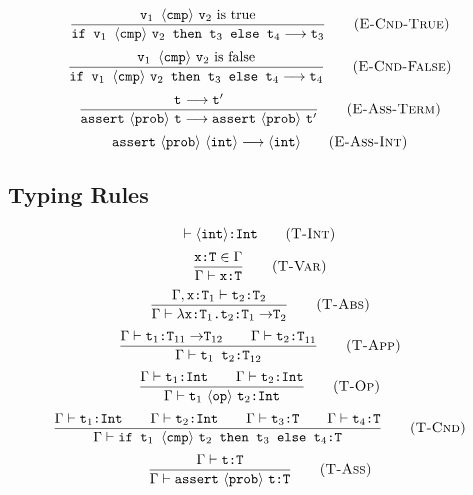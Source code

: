 \documentclass[a4paper]{article}
\begin{document}
\begin{equation}
	\frac{\text{\tt v$_1$ }\langle\text{\tt cmp}\rangle\text{ \tt v$_2$}\text{ is true}}
	{\text{\tt if v$_1$ }\langle\text{\tt cmp}\rangle\text{ \tt v$_2$ then t$_3$ else t$_4$}\longrightarrow
	\text{\tt t}_3}
	\tag{\sc E-Cnd-True}
\end{equation}
\begin{equation}
	\frac{\text{\tt v$_1$ }\langle\text{\tt cmp}\rangle\text{ \tt v$_2$}\text{ is false}}
	{\text{\tt if v$_1$ }\langle\text{\tt cmp}\rangle\text{ \tt v$_2$ then t$_3$ else t$_4$}\longrightarrow
	\text{\tt t}_4}
	\tag{\sc E-Cnd-False}
\end{equation}
\begin{equation}
	\frac{\text{\tt t}_{}\longrightarrow\text{\tt t}^{\prime}_{}}
	{\text{\tt assert}\ \langle\text{\tt prob}\rangle\ \text{\tt t}\longrightarrow\text{\tt assert}\ \langle\text{\tt prob}\rangle\ \text{\tt t}^\prime}
	\tag{\sc E-Ass-Term}
\end{equation}
\begin{equation}
	\text{\tt assert}\ \langle\text{\tt prob}\rangle\ \langle\text{\tt int}\rangle\longrightarrow\langle\text{\tt int}\rangle
	\tag{\sc E-Ass-Int}
\end{equation}
\subsection{Typing Rules}
\begin{equation}
	\vdash\langle\text{\tt int}\rangle\text{\tt :Int}
	\tag{\sc T-Int}
\end{equation}
\begin{equation}
	\frac{\text{\tt x:T}\in\Gamma}
	{\Gamma\vdash\text{\tt x:T}}
	\tag{\sc T-Var}
\end{equation}
\begin{equation}
	\frac{\Gamma,\text{\tt x:T}_1\vdash\text{\tt t$_2$:T$_2$}}
	{\Gamma\vdash\lambda\text{\tt x:T$_1$.t$_2$:T$_1\rightarrow$T}_2}
	\tag{\sc T-Abs}
\end{equation}
\begin{equation}
	\frac{\Gamma\vdash\text{\tt t$_1$:T$_{11}\rightarrow$T$_{12}$}\qquad\Gamma\vdash\text{\tt t$_2$:T}_{11}}
	{\Gamma\vdash\text{\tt t$_1$ t$_2$:T}_{12}}
	\tag{\sc T-App}
\end{equation}
\begin{equation}
	\frac{\Gamma\vdash\text{\tt t$_1$:Int}\qquad\Gamma\vdash\text{\tt t$_2$:Int}}
	{\Gamma\vdash\text{\tt t}_1\ \langle\text{\tt op}\rangle\ \text{\tt t$_2$:Int}}
	\tag{\sc T-Op}
\end{equation}
\begin{equation}
	\frac{\Gamma\vdash\text{\tt t$_1$:Int}\qquad\Gamma\vdash\text{\tt t$_2$:Int}\qquad
	\Gamma\vdash\text{\tt t$_3$:T}\qquad\Gamma\vdash\text{\tt t$_4$:T}}
	{\Gamma\vdash\text{\tt if t$_1$ }\langle\text{\tt cmp}\rangle\text{ \tt t$_2$ then t$_3$ else t$_4$:T}}
	\tag{\sc T-Cnd}
\end{equation}
\begin{equation}
	\frac{\Gamma\vdash\text{\tt t:T}}
	{\Gamma\vdash\text{\tt assert}\ \langle\text{\tt prob}\rangle\ \text{\tt t:T}}
	\tag{\sc T-Ass}
\end{equation}
\pagebreak
\end{document}
